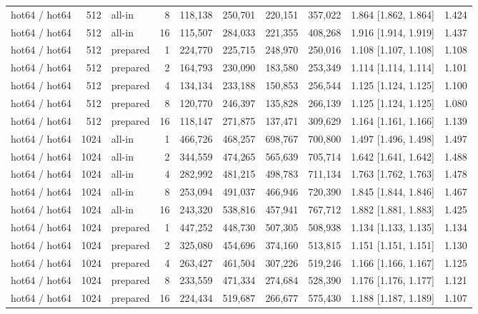\begin{table}[t]
{\begin{tabular}{lrlrrrrrlr}
hot64 / hot64 & 512 & all-in & 8 & 118{,}138 & 250{,}701 & 220{,}151 & 357{,}022 & 1.864 [1.862, 1.864] & 1.424 \\
hot64 / hot64 & 512 & all-in & 16 & 115{,}507 & 284{,}033 & 221{,}355 & 408{,}268 & 1.916 [1.914, 1.919] & 1.437 \\
hot64 / hot64 & 512 & prepared & 1 & 224{,}770 & 225{,}715 & 248{,}970 & 250{,}016 & 1.108 [1.107, 1.108] & 1.108 \\
hot64 / hot64 & 512 & prepared & 2 & 164{,}793 & 230{,}090 & 183{,}580 & 253{,}349 & 1.114 [1.114, 1.114] & 1.101 \\
hot64 / hot64 & 512 & prepared & 4 & 134{,}134 & 233{,}188 & 150{,}853 & 256{,}544 & 1.125 [1.124, 1.125] & 1.100 \\
hot64 / hot64 & 512 & prepared & 8 & 120{,}770 & 246{,}397 & 135{,}828 & 266{,}139 & 1.125 [1.124, 1.125] & 1.080 \\
hot64 / hot64 & 512 & prepared & 16 & 118{,}147 & 271{,}875 & 137{,}471 & 309{,}629 & 1.164 [1.161, 1.166] & 1.139 \\
hot64 / hot64 & 1024 & all-in & 1 & 466{,}726 & 468{,}257 & 698{,}767 & 700{,}800 & 1.497 [1.496, 1.498] & 1.497 \\
hot64 / hot64 & 1024 & all-in & 2 & 344{,}559 & 474{,}265 & 565{,}639 & 705{,}714 & 1.642 [1.641, 1.642] & 1.488 \\
hot64 / hot64 & 1024 & all-in & 4 & 282{,}992 & 481{,}215 & 498{,}783 & 711{,}134 & 1.763 [1.762, 1.763] & 1.478 \\
hot64 / hot64 & 1024 & all-in & 8 & 253{,}094 & 491{,}037 & 466{,}946 & 720{,}390 & 1.845 [1.844, 1.846] & 1.467 \\
hot64 / hot64 & 1024 & all-in & 16 & 243{,}320 & 538{,}816 & 457{,}941 & 767{,}712 & 1.882 [1.881, 1.883] & 1.425 \\
hot64 / hot64 & 1024 & prepared & 1 & 447{,}252 & 448{,}730 & 507{,}305 & 508{,}938 & 1.134 [1.133, 1.135] & 1.134 \\
hot64 / hot64 & 1024 & prepared & 2 & 325{,}080 & 454{,}696 & 374{,}160 & 513{,}815 & 1.151 [1.151, 1.151] & 1.130 \\
hot64 / hot64 & 1024 & prepared & 4 & 263{,}427 & 461{,}504 & 307{,}226 & 519{,}246 & 1.166 [1.166, 1.167] & 1.125 \\
hot64 / hot64 & 1024 & prepared & 8 & 233{,}559 & 471{,}334 & 274{,}684 & 528{,}390 & 1.176 [1.176, 1.177] & 1.121 \\
hot64 / hot64 & 1024 & prepared & 16 & 224{,}434 & 519{,}687 & 266{,}677 & 575{,}430 & 1.188 [1.187, 1.189] & 1.107 \\
\bottomrule
\end{tabular}}
\end{table}

